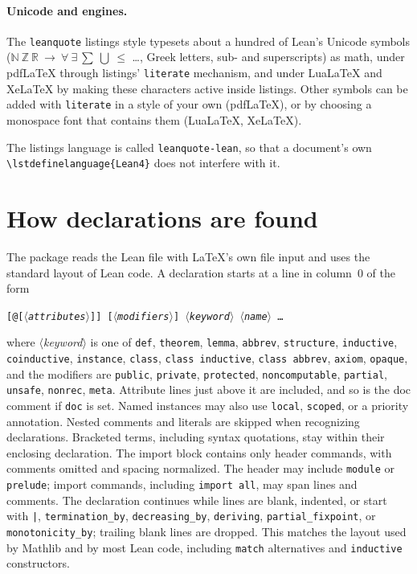 \documentclass[11pt]{article}
\newcommand{\meta}[1]{\ensuremath{\langle}\textit{#1}\ensuremath{\rangle}}
\newcommand{\opt}[1]{\texttt{#1}}
\begin{document}
\paragraph{Unicode and engines.} The \texttt{leanquote} listings style typesets about a hundred of Lean's Unicode symbols
($\mathbb{N}\ \mathbb{Z}\ \mathbb{R}\ \to\ \forall\ \exists\ \sum\ \bigcup\ \le$ \dots, Greek letters, sub- and superscripts) as math, under
pdf\LaTeX{} through listings' \opt{literate} mechanism, and under Lua\LaTeX{} and Xe\LaTeX{} by
making these characters active inside listings. Other symbols can be added with \opt{literate}
in a style of your own (pdf\LaTeX), or by choosing a monospace font that contains them
(Lua\LaTeX, Xe\LaTeX).

The listings language is called \texttt{leanquote-lean}, so that a document's own
\verb|\lstdefinelanguage{Lean4}| does not interfere with it.

\section{How declarations are found}

The package reads the Lean file with \LaTeX's own file input and uses the standard layout of
Lean code. A declaration starts at a line in column~0 of the form
\begin{center}
\texttt{[@[\meta{attributes}]] [\meta{modifiers}] \meta{keyword} \meta{name} \dots}
\end{center}
where \meta{keyword} is one of \texttt{def}, \texttt{theorem}, \texttt{lemma}, \texttt{abbrev},
\texttt{structure}, \texttt{inductive}, \texttt{coinductive}, \texttt{instance}, \texttt{class},
\texttt{class inductive}, \texttt{class abbrev}, \texttt{axiom}, \texttt{opaque}, and the modifiers are
\texttt{public}, \texttt{private}, \texttt{protected},
\texttt{noncomputable}, \texttt{partial}, \texttt{unsafe}, \texttt{nonrec}, \texttt{meta}.
Attribute lines just above it are included, and so is the doc comment if \opt{doc} is set.
Named instances may also use \texttt{local}, \texttt{scoped}, or a priority annotation.
Nested comments and literals are skipped when recognizing declarations. Bracketed terms,
including syntax quotations, stay within their enclosing declaration.
The import block contains only header commands, with comments omitted and spacing normalized.
The header may include \texttt{module} or \texttt{prelude}; import commands, including
\texttt{import all}, may span lines and comments.
The declaration continues while lines are blank, indented, or start with \texttt{|},
\texttt{termination\_by}, \texttt{decreasing\_by}, \texttt{deriving}, \texttt{partial\_fixpoint},
or \texttt{monotonicity\_by}; trailing blank lines are
dropped. This matches the layout used by Mathlib and by most Lean code, including
\texttt{match} alternatives and \texttt{inductive} constructors.
\end{document}
